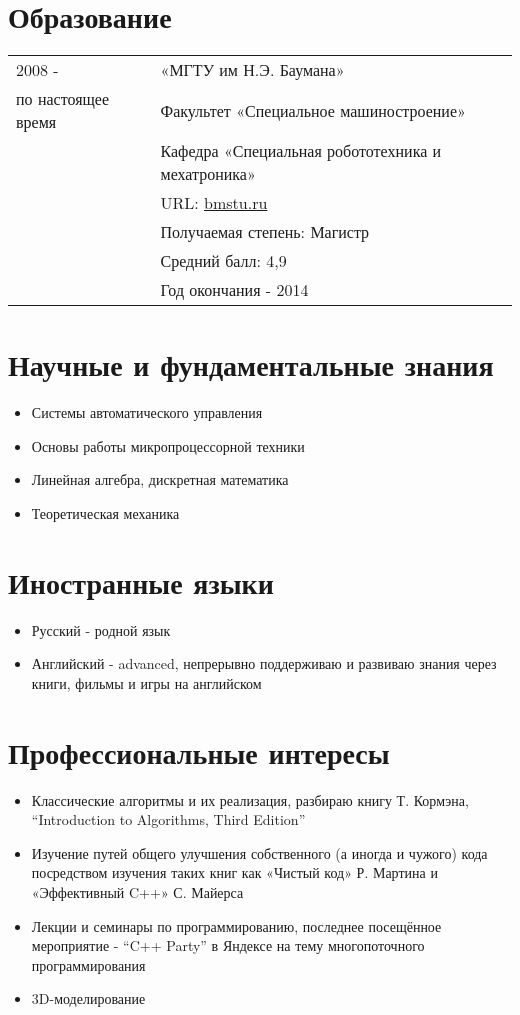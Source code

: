 \documentclass[a4paper, 11pt]{article}
\begin{document}
\section{Образование}
\begin{tabular}{p{25mm}|p{110mm}}
2008 -              & «МГТУ им Н.Э. Баумана»                            \\
по настоящее время  & Факультет «Специальное машиностроение»            \\
                    & Кафедра «Специальная робототехника и мехатроника» \\
                    & URL: \href{http://bmstu.ru}{bmstu.ru}             \\
                    & Получаемая степень: Магистр                       \\
                    & Средний балл: 4,9                                 \\
                    & Год окончания - 2014
\end{tabular}

\section{Научные и фундаментальные знания}
\begin{itemize}
    \item Системы автоматического управления
    \item Основы работы микропроцессорной техники
    \item Линейная алгебра, дискретная математика
    \item Теоретическая механика
\end{itemize}

\section{Иностранные языки}
\begin{itemize}
    \item   Русский    - родной язык
    \item   Английский - advanced, непрерывно поддерживаю и развиваю знания через
            книги, фильмы и игры на английском
\end{itemize}

\section{Профессиональные интересы}
\begin{itemize}
    \item   Классические алгоритмы и их реализация, разбираю книгу Т. Кормэна,
            ``Introduction to Algorithms, Third Edition''
    \item   Изучение путей общего улучшения собственного (а иногда и чужого)
            кода посредством изучения таких книг как «Чистый код» Р. Мартина и
            «Эффективный C++» С. Майерса
    \item   Лекции и семинары по программированию, последнее посещённое мероприятие
            - ``C++ Party'' в Яндексе на тему многопоточного программирования
    \item   3D-моделирование
\end{itemize}
\end{document}
